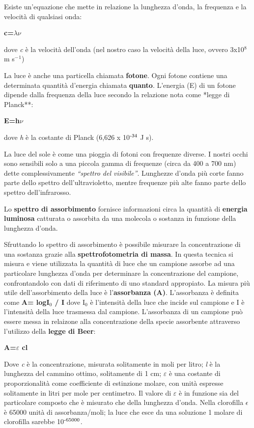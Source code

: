 \documentclass[]{article}
\begin{document}
Esiste un'equazione che mette in relazione la lunghezza d'onda, la
frequenza e la velocità di qualsiasi onda:

\textbf{c=$\lambda$$\nu$}

dove \emph{c} è la velocità dell'onda (nel nostro caso la velocità della
luce, ovvero 3x10$^8$ m s$^-$$^1$)

La luce è anche una particella chiamata \textbf{fotone}. Ogni fotone
contiene una determinata quantità d'energia chiamata \textbf{quanto}.
L'energia (E) di un fotone dipende dalla frequenza della luce secondo la
relazione nota come *legge di Planck**:

\textbf{E=h$\nu$}

dove \emph{h} è la costante di Planck (6,626 x 10$\textsuperscript{-34}$
J s).

La luce del sole è come una pioggia di fotoni con frequenze diverse. I
nostri occhi sono sensibili solo a una piccola gamma di frequenze (circa
da 400 a 700 nm) dette complessivamente \emph{``spettro del visibile''}.
Lunghezze d'onda più corte fanno parte dello spettro dell'ultravioletto,
mentre frequenze più alte fanno parte dello spettro dell'infrarosso.

Lo \textbf{spettro di assorbimento} fornisce informazioni circa la
quantità di \textbf{energia luminosa} catturata o assorbita da una
molecola o sostanza in funzione della lunghezza d'onda.

Sfruttando lo spettro di assorbimento è possibile misurare la
concentrazione di una sostanza grazie alla \textbf{spettrofotometria di
massa}. In questa tecnica si misura e viene utilizzata la quantità di
luce che un campione assorbe ad una particolare lunghezza d'onda per
determinare la concentrazione del campione, confrontandolo con dati di
riferimento di uno standard appropiato. La misura più utile
dell'assorbimento della luce è l'\textbf{assorbanza (A)}. L'assorbanza è
definita come \textbf{A= logI$_0$ / I} dove I$_0$ è l'intensità della
luce che incide sul campione e I è l'intensità della luce trasmessa dal
campione. L'assorbanza di un campione può essere messa in relaizone alla
concentrazione della specie assorbente attraverso l'utilizzo della
\textbf{legge di Beer}:

\textbf{A=$\varepsilon$ cl}

Dove \emph{c} è la concentrazione, misurata solitamente in moli per
litro; \emph{l} è la lunghezza del cammino ottimo, solitamente di 1 cm;
$\varepsilon$ è una costante di proporzionalità come coefficiente di
estinzione molare, con unità espresse solitamente in litri per mole per
centimetro. Il valore di $\varepsilon$ è in funzione sia del particolare
composto che è misurato che della lunghezza d'onda. Nella clorofilla
$\epsilon$ è 65000 unità di assorbanza/moli; la luce che esce da una
soluzione 1 molare di clorofilla sarebbe 10$\textsuperscript{-65000}$.
\end{document}
